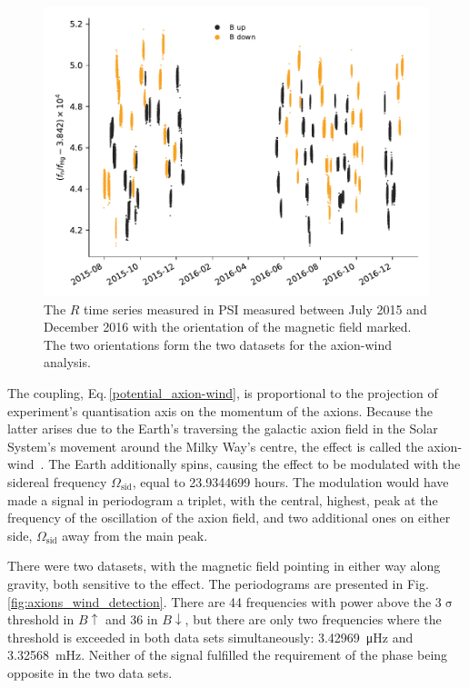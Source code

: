\begin{figure}
  \centering
  \includegraphics[width=0.9\linewidth]{gfx/axions/wind_winddeltah4mm_time_domain_inset_no_yerr.pdf}
  \caption{The $R$ time series measured in PSI measured between July 2015 and December 2016 with the orientation of the magnetic field marked. The two orientations form the two datasets for the axion-wind analysis.}\label{fig:axions_wind_time_domain}
\end{figure}

The coupling, Eq.\,\ref{potential_axion-wind}, is proportional to the projection of experiment's quantisation axis on the momentum of the axions.
Because the latter arises due to the Earth's traversing the galactic axion field in the Solar System's movement around the Milky Way's centre, the effect is called the axion-wind~\cite{Stadnik2014A}.
The Earth additionally spins, causing the effect to be modulated with the sidereal frequency $\Omega_\text{sid}$, equal to \num[detect-all=true]{23.9344699} hours. 
The modulation would have made a signal in periodogram a triplet, with the central, highest, peak at the frequency of the oscillation of the axion field, and two additional ones on either side, $\Omega_\text{sid}$ away from the main peak.

There were two datasets, with the magnetic field pointing in either way along gravity, both sensitive to the effect. The periodograms are presented in Fig.\,\ref{fig:axions_wind_detection}. There are 44 frequencies with power above the 3$\upsigma$ threshold in $B\uparrow$ and 36 in $B\downarrow$, but there are only two frequencies where the threshold is exceeded in both data sets simultaneously: \SI{3.42969}{\micro\hertz} and \SI{3.32568}{\milli\hertz}. Neither of the signal fulfilled the requirement of the phase being opposite in the two data sets.

